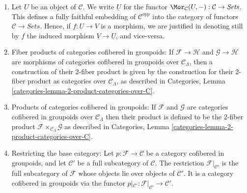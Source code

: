 \begin{remarks}
\begin{enumerate}
to the category of categories cofibered in groupoids over $\mathcal{C}$.
We identify the category of functors with its image under this embedding.
Hence if $F : \mathcal{C} \to \textit{Sets}$ is a functor, we denote the
associated category cofibered in sets also by $F$; and if
$\varphi : F \to G$ is a morphism of functors, we denote still by $\varphi$
the corresponding morphism of categories cofibered in sets, and vice-versa.
See Categories, Section \ref{categories-section-fibred-in-sets}.
\item
\label{formal-defos-item-definition-yoneda}
Let $U$ be an object of $\mathcal{C}$.  We write $\underline{U}$ for the
functor
$\Mor_\mathcal{C}(U, -): \mathcal{C} \to
\textit{Sets}$.  This defines a fully faithful embedding of $\mathcal
C^{opp}$ into the category of functors $\mathcal{C} \to
\textit{Sets}$. Hence, if $f : U \to V$ is a morphism, we are
justified in denoting still by $f$ the induced morphism $\underline{V}
\to \underline{U}$, and vice-versa.
\item
\label{formal-defos-item-fibre-product}
Fiber products of categories cofibered in groupoids: If $\mathcal{F}
\to \mathcal{H}$ and $\mathcal{G} \to \mathcal{H}$ are morphisms
of categories cofibered in groupoids over $\mathcal{C}_\Lambda$, then a
construction of their 2-fiber product is given by the construction for their
2-fiber product as categories over $\mathcal{C}_\Lambda$, as described in
Categories, Lemma \ref{categories-lemma-2-product-categories-over-C}.
\item
\label{formal-defos-item-product}
Products of categories cofibered in groupoids: If $\mathcal{F}$ and
$\mathcal{G}$ are categories cofibered in groupoids over
$\mathcal{C}_\Lambda$ then their product is defined to be the $2$-fiber product
$\mathcal{F} \times_{\mathcal{C}_\Lambda} \mathcal{G}$ as described in
Categories, Lemma \ref{categories-lemma-2-product-categories-over-C}.
\item
\label{formal-defos-item-definition-restricting-base-category}
Restricting the base category: Let $p : \mathcal{F} \to \mathcal{C}$ be a
category cofibered in groupoids, and let $\mathcal{C}'$ be a full
subcategory of $\mathcal{C}$. The restriction $\mathcal{F}|_{\mathcal{C}'}$
is the full subcategory of $\mathcal{F}$ whose objects lie over
objects of $\mathcal{C}'$. It is a category cofibered in groupoids via
the functor
$p|_{\mathcal{C}'}: \mathcal{F}|_{\mathcal{C}'} \to \mathcal{C}'$.
\end{enumerate}
\end{remarks}


